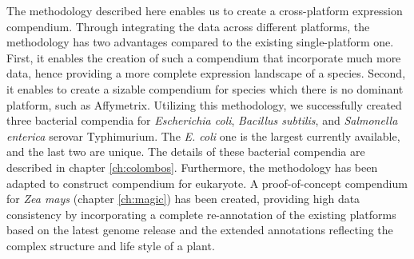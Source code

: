 The methodology described here enables us to create a cross-platform
expression compendium.
%
Through integrating the data across different platforms, the methodology has
two advantages compared to the existing single-platform one.  First, it
enables the creation of such a compendium that incorporate much more data, 
hence providing a more complete expression landscape of a species.
Second, it enables to create a sizable compendium for species which there is
no dominant platform, such as Affymetrix.
%
Utilizing this methodology, we successfully created three bacterial
compendia for {\it Escherichia coli}, {\it Bacillus subtilis}, and {\it
  Salmonella enterica} serovar Typhimurium.  The \textit{E. coli} one is
the largest currently available, and the last two are unique.
%
The details of these bacterial compendia are described in chapter
\ref{ch:colombos}.
%
Furthermore, the methodology has been adapted to construct compendium for
eukaryote.
%
A proof-of-concept compendium for \textit{Zea mays} (chapter \ref{ch:magic})
has been created, providing high data consistency by incorporating a complete
re-annotation of the existing platforms based on the latest genome release and
the extended annotations reflecting the complex structure and life style of a
plant.










